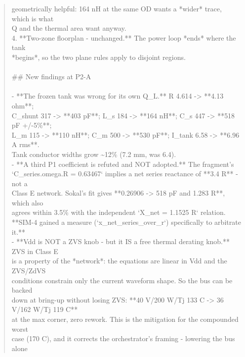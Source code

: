\documentclass[11pt,a4paper]{article}
\begin{document}
\begin{quote}
   geometrically helpful: 164 nH at the same OD wants a {*}wider{*} trace, which is what\\
   Q and the thermal area want anyway.\\
4. {*}{*}Two-zone floorplan - unchanged.{*}{*} The power loop {*}ends{*} where the tank\\
   {*}begins{*}, so the two plane rules apply to disjoint regions.\\
~\\
\#\# New findings at P2-A\\
~\\
- {*}{*}The frozen tank was wrong for its own Q\_L.{*}{*} R 4.614 -\textgreater{} {*}{*}4.13 ohm{*}{*};\\
  C\_shunt 317 -\textgreater{} {*}{*}403 pF{*}{*}; L\_s 184 -\textgreater{} {*}{*}164 nH{*}{*}; C\_s 447 -\textgreater{} {*}{*}518 pF +/-5\%{*}{*};\\
  L\_m 115 -\textgreater{} {*}{*}110 nH{*}{*}; C\_m 500 -\textgreater{} {*}{*}530 pF{*}{*}; I\_tank 6.58 -\textgreater{} {*}{*}6.96 A rms{*}{*}.\\
  Tank conductor widths grow \textasciitilde{}12\% (7.2 mm, was 6.4).\\
- {*}{*}A third P1 coefficient is refuted and NOT adopted.{*}{*} The fragment's\\
  `C\_series.omega.R = 0.63467` implies a net series reactance of {*}{*}3.4 R{*}{*} - not a\\
  Class E network. Sokal's fit gives {*}{*}0.26906 -\textgreater{} 518 pF and 1.283 R{*}{*}, which also\\
  agrees within 3.5\% with the independent `X\_net = 1.1525 R` relation.\\
  {*}{*}SIM-4 gained a measure (`x\_net\_series\_over\_r`) specifically to arbitrate it.{*}{*}\\
- {*}{*}Vdd is NOT a ZVS knob - but it IS a free thermal derating knob.{*}{*} ZVS in Class E\\
  is a property of the {*}network{*}: the equations are linear in Vdd and the ZVS/ZdVS\\
  conditions constrain only the current waveform shape. So the bus can be backed\\
  down at bring-up without losing ZVS: {*}{*}40 V/200 W/Tj 133 C -\textgreater{} 36 V/162 W/Tj 119 C{*}{*}\\
  at the max corner, zero rework. This is the mitigation for the compounded worst\\
  case (170 C), and it corrects the orchestrator's framing - lowering the bus alone\\

\end{quote}
\end{document}
